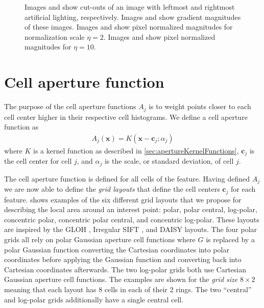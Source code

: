 \documentclass[thesis.tex]{subfiles}
\def\x{\mathbf{x}}
\def\c{\mathbf{c}}
\begin{document}
\begin{figure}[p]
\begin{subfigure}[t]{0.48\textwidth}
        \caption{}
        \label{fig:pixelNormalizationExample8}
    \end{subfigure}
    \caption{Images  and  show cut-outs of an image with leftmost and rightmost artificial lighting, respectively. Images  and  show gradient magnitudes of these images. Images  and  show pixel normalized magnitudes for normalization scale $\eta = 2$. Images  and  show pixel normalized magnitudes for $\eta = 10$.}
    \label{fig:pixelNormalizationExample}
\end{figure}
%
\section{Cell aperture function}
\label{sec:cellApertureFunction}
%
The purpose of the cell aperture functions $A_j$ is to weight points closer to each cell center higher in their respective cell histograms. We define a cell aperture function as
%
\begin{align}
A_j(\x) = K(\x - \c_j; \alpha_j)
\end{align}
%
where $K$ is a kernel function as described in \ref{sec:apertureKernelFunctions}, $\c_j$ is the cell center for cell $j$, and $\alpha_j$ is the scale, or standard deviation, of cell $j$.

The cell aperture function is defined for all cells of the feature. Having defined $A_j$ we are now able to define the \emph{grid layouts} that define the cell centers $\boldsymbol{c}_j$ for each feature.  shows examples of the six different grid layouts that we propose for describing the local area around an interest point: polar, polar central, log-polar, concentric polar, concentric polar central, and concentric log-polar. These layouts are inspired by the GLOH \cite{mikolajczyk2005performance}, Irregular SIFT \cite{cui2009scale}, and DAISY \cite{tola2008fast} layouts. The four polar grids all rely on polar Gaussian aperture cell functions where $G$ is replaced by a polar Gaussian function converting the Cartesian coordinates into polar coordinates before applying the Gaussian function and converting back into Cartesian coordinates afterwards. The two log-polar grids both use Cartesian Gaussian aperture cell functions. The examples are shown for the \emph{grid size} $8\times 2$ meaning that each layout has 8 cells in each of their 2 rings. The two ``central'' and log-polar grids additionally have a single central cell.
\end{document}
